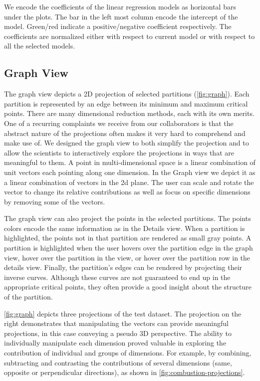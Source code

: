 We encode the coefficients of the linear regression models as horizontal bars under the plots. The bar in the left most column encode the intercept of the model. Green/red indicate a positive/negative coefficient respectively. The coefficients are normalized either with respect to current model or with respect to all the selected models. 

\subsection{Graph View}
The graph view depicts a 2D projection of selected partitions (\autoref{fig:graph}). Each partition is represented by an edge between its minimum and maximum critical points. There are many dimensional reduction methods, each with its own merits. One of a recurring complaints we receive from our collaborators is that the abstract nature of the projections often makes it very hard to comprehend and make use of. We designed the graph view to both simplify the projection and to allow the scientists to interactively explore the projections in ways that are meaningful to them. A point in multi-dimensional space is a linear combination of unit vectors each pointing along one dimension. In the Graph view we depict it as a linear combination of vectors in the 2d plane. The user can scale and rotate the vector to change its relative contributions as well as focus on specific dimensions by removing some of the vectors.

The graph view can also project the points in the selected partitions. The points colors encode the same information as in the Details view. When a partition is highlighted, the points not in that partition are rendered as small gray points. A partition is highlighted when the user hovers over the partition edge in the graph view, hover over the partition in the \RT view, or hover over the partition row in the details view. Finally, the partition's edges can be rendered by projecting their inverse curves. Although these curves are not guaranteed to end up in the appropriate critical points, they often provide a good insight about the structure of the partition.

\autoref{fig:graph} depicts three projections of the test dataset. The projection on the right demonstrates that manipulating the vectors can provide meaningful projections, in this case conveying a pseudo 3D perspective. The ability to individually manipulate each dimension proved valuable in exploring the contribution of individual and groups of dimensions. For example, by combining, subtracting and contrasting the contributions of several dimensions (same, opposite or perpendicular directions), as shown in \autoref{fig:combustion-projections}. 

